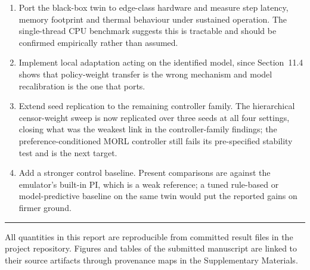 \documentclass[11pt,a4paper]{article}
\begin{document}
\begin{enumerate}[leftmargin=1.4em,itemsep=2pt]
\item Port the black-box twin to edge-class hardware and measure step latency, memory footprint
and thermal behaviour under sustained operation. The single-thread CPU benchmark suggests this is
tractable and should be confirmed empirically rather than assumed.
\item Implement local adaptation acting on the identified model, since Section~11.4 shows that
policy-weight transfer is the wrong mechanism and model recalibration is the one that ports.
\item Extend seed replication to the remaining controller family. The hierarchical
censor-weight sweep is now replicated over three seeds at all four settings, closing what was the
weakest link in the controller-family findings; the preference-conditioned MORL controller still
fails its pre-specified stability test and is the next target.
\item Add a stronger control baseline. Present comparisons are against the emulator's built-in
PI, which is a weak reference; a tuned rule-based or model-predictive baseline on the same twin
would put the reported gains on firmer ground.
\end{enumerate}

\vspace{6pt}
\hrule
\vspace{4pt}
{\footnotesize All quantities in this report are reproducible from committed result files in the
project repository. Figures and tables of the submitted manuscript are linked to their source
artifacts through provenance maps in the Supplementary Materials.}
\end{document}
